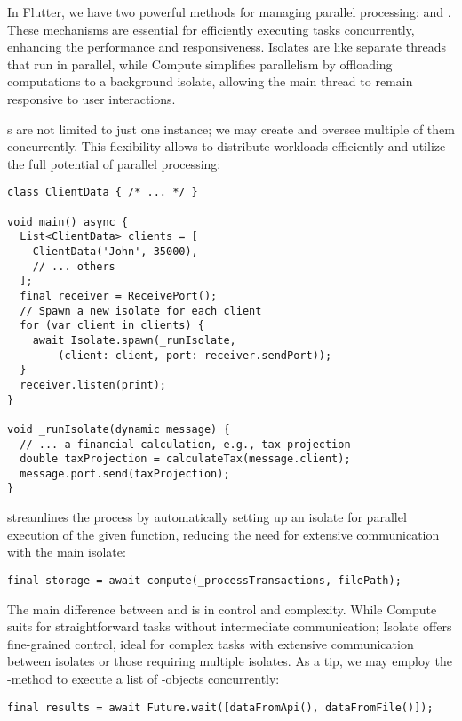 In Flutter, we have two powerful methods for managing parallel processing:  and . These 
mechanisms are essential for efficiently executing tasks concurrently, enhancing the performance and responsiveness. 
Isolates are like separate threads that run in parallel, while Compute simplifies parallelism by offloading 
computations to a background isolate, allowing the main thread to remain responsive to user interactions.

s are not limited to just one instance; we may create and oversee multiple of them concurrently. This 
flexibility allows to distribute workloads efficiently and utilize the full potential of parallel processing:

\begin{lstlisting}
class ClientData { /* ... */ }

void main() async {
  List<ClientData> clients = [
    ClientData('John', 35000), 
    // ... others
  ];
  final receiver = ReceivePort();
  // Spawn a new isolate for each client
  for (var client in clients) {
    await Isolate.spawn(_runIsolate,
        (client: client, port: receiver.sendPort));
  }
  receiver.listen(print);
}

void _runIsolate(dynamic message) {
  // ... a financial calculation, e.g., tax projection
  double taxProjection = calculateTax(message.client);
  message.port.send(taxProjection);
}
\end{lstlisting}

\noindent {} streamlines the process by automatically setting up an isolate for parallel execution of the 
given function, reducing the need for extensive communication with the main isolate:

\begin{lstlisting}
final storage = await compute(_processTransactions, filePath);
\end{lstlisting}

\noindent The main difference between  and  is in control and complexity. While Compute suits 
for straightforward tasks without intermediate communication; Isolate offers fine-grained control, ideal for complex 
tasks with extensive communication between isolates or those requiring multiple isolates. As a tip, we may employ the 
-method to execute a list of -objects concurrently:

\begin{lstlisting}
final results = await Future.wait([dataFromApi(), dataFromFile()]);
\end{lstlisting}


